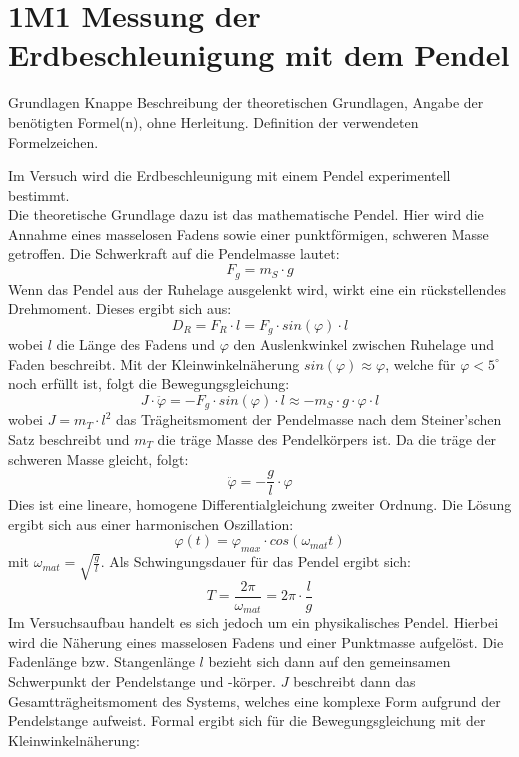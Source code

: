 \section{1M1 Messung der Erdbeschleunigung mit dem Pendel}

\begin{aufgabe}{Grundlagen}
  Knappe Beschreibung der theoretischen Grundlagen, Angabe der
  benötigten Formel(n), ohne Herleitung. Definition der verwendeten
  Formelzeichen.
\end{aufgabe}

Im Versuch wird die Erdbeschleunigung mit einem Pendel experimentell bestimmt.\\
Die theoretische Grundlage dazu ist das mathematische Pendel. Hier wird die Annahme eines masselosen Fadens sowie einer punktförmigen, schweren Masse getroffen. Die Schwerkraft auf die Pendelmasse lautet:\\
\[
F_g = m_S \cdot g 
\]
Wenn das Pendel aus der Ruhelage ausgelenkt wird, wirkt eine ein rückstellendes Drehmoment. Dieses ergibt sich aus:
\[
D_R = F_R \cdot l = F_g \cdot sin(\varphi) \cdot l
\]
wobei $l$ die Länge des Fadens und $\varphi$ den Auslenkwinkel zwischen Ruhelage und Faden beschreibt. Mit der Kleinwinkelnäherung $sin(\varphi) \approx \varphi$, welche für $\varphi<5^{\circ}$ noch erfüllt ist,  folgt die Bewegungsgleichung: \\
\[
J \cdot \ddot{\varphi} = -F_g \cdot sin(\varphi) \cdot l \approx -m_S \cdot g \cdot \varphi \cdot l  \]
wobei $J = m_T \cdot l^2$ das Trägheitsmoment der Pendelmasse nach dem Steiner'schen Satz beschreibt und $m_T$ die träge Masse des Pendelkörpers ist. Da die träge der schweren Masse gleicht, folgt:
\[
\ddot{\varphi} = - \frac{g}{l} \cdot \varphi
\] 
Dies ist eine lineare, homogene Differentialgleichung zweiter Ordnung. Die Lösung ergibt sich aus einer harmonischen Oszillation: 
\[
\varphi(t) = \varphi_{max} \cdot cos(\omega_{mat} t)
\]
mit $\omega_{mat} = \sqrt{\frac{g}{l}}$.
Als Schwingungsdauer für das Pendel ergibt sich:
\[
T = \frac{2\pi}{\omega_{mat}} = 2\pi \cdot \frac{l}{g}
\]
Im Versuchsaufbau handelt es sich jedoch um ein physikalisches Pendel. Hierbei wird die Näherung eines masselosen Fadens und einer Punktmasse aufgelöst. Die Fadenlänge bzw. Stangenlänge $l$ bezieht sich dann auf den gemeinsamen Schwerpunkt der Pendelstange und -körper. $J$ beschreibt dann das Gesamtträgheitsmoment des Systems, welches eine komplexe Form aufgrund der Pendelstange aufweist. Formal ergibt sich für die Bewegungsgleichung mit der Kleinwinkelnäherung:
